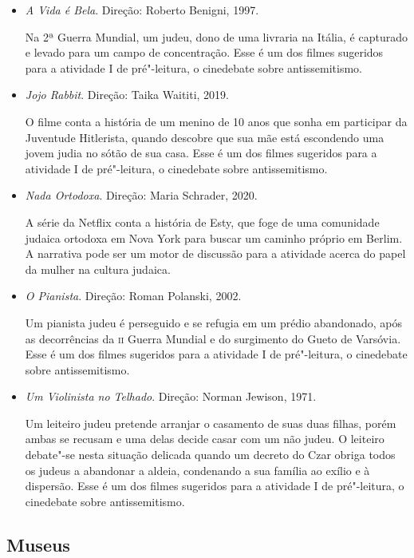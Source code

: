 \documentclass[12pt]{extarticle}
\begin{document}
\begin{itemize}
\item\textit{A Vida é Bela}. Direção: Roberto Benigni, 1997.

Na 2ª Guerra Mundial, um judeu, dono de uma livraria na Itália,
é capturado e levado para um campo de concentração. Esse é um dos 
filmes sugeridos para a atividade I de pré"-leitura, 
o cinedebate sobre antissemitismo.

\item\textit{Jojo Rabbit}. Direção: Taika Waititi, 2019.

O filme conta a história de um menino de 10 anos que sonha
em participar da Juventude Hitlerista, quando descobre que sua
mãe está escondendo uma jovem judia no sótão de sua casa.
Esse é um dos 
filmes sugeridos para a atividade I de pré"-leitura, 
o cinedebate sobre antissemitismo.

\item\textit{Nada Ortodoxa}. Direção: Maria Schrader, 2020.

A série da Netflix conta a história de Esty, que foge de uma comunidade 
judaica ortodoxa em Nova York para buscar um caminho próprio em Berlim.
A narrativa pode ser um motor de discussão para a atividade
acerca do papel da mulher na cultura judaica.

\item\textit{O Pianista}. Direção: Roman Polanski, 2002.

Um pianista judeu é perseguido e se refugia em um prédio abandonado,
após as decorrências da \textsc{ii} Guerra Mundial e do surgimento do Gueto de Varsóvia.
Esse é um dos 
filmes sugeridos para a atividade I de pré"-leitura,
o cinedebate sobre antissemitismo.

\item\textit{Um Violinista no Telhado}. Direção: Norman Jewison, 1971.

Um leiteiro judeu pretende arranjar o casamento de suas duas filhas,
porém ambas se recusam e uma delas decide casar com um não judeu. O
leiteiro debate"-se nesta situação delicada quando um decreto do Czar
obriga todos os judeus a abandonar a aldeia, condenando a sua família ao
exílio e à dispersão. Esse é um dos 
filmes sugeridos para a atividade I de pré"-leitura, 
o cinedebate sobre antissemitismo.
\end{itemize}

\subsection{Museus}
\end{document}
